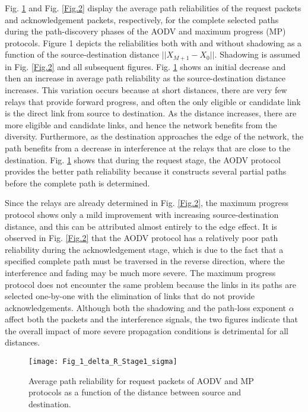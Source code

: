 \documentclass[conference]{IEEEtran}
\begin{document}
Fig. \ref{Fig.1} and Fig. \ref{Fig.2} display the average path reliabilities of the request packets
and acknowledgement packets, respectively, for the complete selected paths
during the path-discovery phases of the AODV and maximum
progress (MP) protocols. Figure 1 depicts the reliabilities both with and without
shadowing as a function of the source-destination distance $||X_{M+1}-X_{0}||.$ Shadowing is
assumed in Fig. \ref{Fig.2} and all subsequent figures. Fig. \ref{Fig.1} shows an initial decrease and then an increase in average path reliability as the source-destination distance
increases. This variation occurs because at short distances, there are very few relays that provide forward
progress, and often the only eligible or candidate link
is the direct link from source to destination. As the
distance increases, there are more eligible and candidate
links, and hence the network benefits from the diversity.
Furthermore, as the destination approaches the edge
of the network, the path benefits from a decrease in
interference at the relays that are close to the destination.
Fig. \ref{Fig.1} shows that during the request stage, the AODV
protocol provides the better path reliability because it
constructs several partial paths before the complete path
is determined.

Since the relays are already determined in Fig. \ref{Fig.2}, the
maximum progress protocol shows only a mild improvement with increasing source-destination distance, and
this can be attributed almost entirely to the edge effect. It
is observed in Fig. \ref{Fig.2} that the AODV protocol has a relatively poor path reliability during the acknowledgement
stage, which is due to the fact that a specified complete
path must be traversed in the reverse direction, where the
interference and fading may be much more severe. The
maximum progress protocol does not encounter the same
problem because the links in its paths are selected one-by-one with the elimination of links that do not provide
acknowledgements. Although both the shadowing and
the path-loss exponent $\alpha$ affect both the packets and
the interference signals, the two figures indicate that the
overall impact of more severe propagation conditions is
detrimental for all distances.


\begin{figure}[tb]\centering
\texttt{[image: Fig\_1\_delta\_R\_Stage1\_sigma]}\caption{Average path reliability for request packets of AODV and MP protocols as a function of the distance between source and destination.} \label{Fig.1}
\end{figure}
\end{document}
